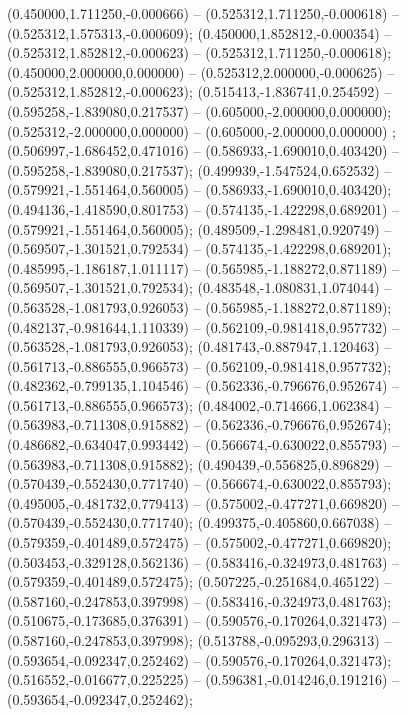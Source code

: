  (0.450000,1.711250,-0.000666) -- (0.525312,1.711250,-0.000618) -- (0.525312,1.575313,-0.000609);
 (0.450000,1.852812,-0.000354) -- (0.525312,1.852812,-0.000623) -- (0.525312,1.711250,-0.000618);
 (0.450000,2.000000,0.000000) -- (0.525312,2.000000,-0.000625) -- (0.525312,1.852812,-0.000623);
 (0.515413,-1.836741,0.254592) -- (0.595258,-1.839080,0.217537) -- (0.605000,-2.000000,0.000000);
 (0.525312,-2.000000,0.000000) -- (0.605000,-2.000000,0.000000) ;
 (0.506997,-1.686452,0.471016) -- (0.586933,-1.690010,0.403420) -- (0.595258,-1.839080,0.217537);
 (0.499939,-1.547524,0.652532) -- (0.579921,-1.551464,0.560005) -- (0.586933,-1.690010,0.403420);
 (0.494136,-1.418590,0.801753) -- (0.574135,-1.422298,0.689201) -- (0.579921,-1.551464,0.560005);
 (0.489509,-1.298481,0.920749) -- (0.569507,-1.301521,0.792534) -- (0.574135,-1.422298,0.689201);
 (0.485995,-1.186187,1.011117) -- (0.565985,-1.188272,0.871189) -- (0.569507,-1.301521,0.792534);
 (0.483548,-1.080831,1.074044) -- (0.563528,-1.081793,0.926053) -- (0.565985,-1.188272,0.871189);
 (0.482137,-0.981644,1.110339) -- (0.562109,-0.981418,0.957732) -- (0.563528,-1.081793,0.926053);
 (0.481743,-0.887947,1.120463) -- (0.561713,-0.886555,0.966573) -- (0.562109,-0.981418,0.957732);
 (0.482362,-0.799135,1.104546) -- (0.562336,-0.796676,0.952674) -- (0.561713,-0.886555,0.966573);
 (0.484002,-0.714666,1.062384) -- (0.563983,-0.711308,0.915882) -- (0.562336,-0.796676,0.952674);
 (0.486682,-0.634047,0.993442) -- (0.566674,-0.630022,0.855793) -- (0.563983,-0.711308,0.915882);
 (0.490439,-0.556825,0.896829) -- (0.570439,-0.552430,0.771740) -- (0.566674,-0.630022,0.855793);
 (0.495005,-0.481732,0.779413) -- (0.575002,-0.477271,0.669820) -- (0.570439,-0.552430,0.771740);
 (0.499375,-0.405860,0.667038) -- (0.579359,-0.401489,0.572475) -- (0.575002,-0.477271,0.669820);
 (0.503453,-0.329128,0.562136) -- (0.583416,-0.324973,0.481763) -- (0.579359,-0.401489,0.572475);
 (0.507225,-0.251684,0.465122) -- (0.587160,-0.247853,0.397998) -- (0.583416,-0.324973,0.481763);
 (0.510675,-0.173685,0.376391) -- (0.590576,-0.170264,0.321473) -- (0.587160,-0.247853,0.397998);
 (0.513788,-0.095293,0.296313) -- (0.593654,-0.092347,0.252462) -- (0.590576,-0.170264,0.321473);
 (0.516552,-0.016677,0.225225) -- (0.596381,-0.014246,0.191216) -- (0.593654,-0.092347,0.252462);
